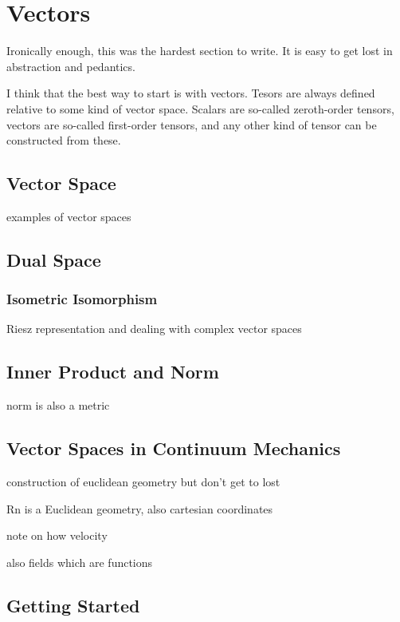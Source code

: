 \chapter{Vectors}
\label{chapter:Vectors}


Ironically enough, this was the hardest section to write. It is easy to get lost in abstraction and pedantics.

I think that the best way to start is with vectors. Tesors are always defined relative to some kind of vector space. Scalars are so-called zeroth-order tensors, vectors are so-called first-order tensors, and any other kind of tensor can be constructed from these.

\section{Vector Space}

examples of vector spaces

\section{Dual Space}

\subsection{Isometric Isomorphism}

Riesz representation and dealing with complex vector spaces

\section{Inner Product and Norm}

norm is also a metric

\section{Vector Spaces in Continuum Mechanics}

construction of euclidean geometry but don't get to lost

Rn is a Euclidean geometry, also cartesian coordinates

note on how velocity

also fields which are functions

\section{Getting Started}

